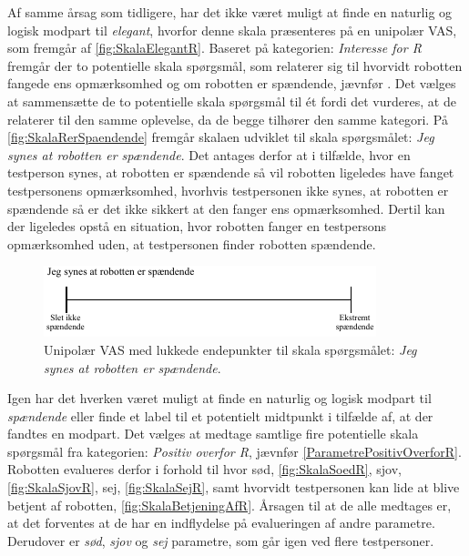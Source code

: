 \noindent
%
Af samme årsag som tidligere, har det ikke været muligt at finde en naturlig og logisk modpart til \textit{elegant}, hvorfor denne skala præsenteres på en unipolær VAS, som fremgår af \autoref{fig:SkalaElegantR}.\blankline
%
Baseret på kategorien: \textit{Interesse for R} fremgår der to potentielle skala spørgsmål, som relaterer sig til hvorvidt robotten fangede ens opmærksomhed og om robotten er spændende, jævnfør . Det vælges at sammensætte de to potentielle skala spørgsmål til ét fordi det vurderes, at de relaterer til den samme oplevelse, da de begge tilhører den samme kategori. På \autoref{fig:SkalaRerSpaendende} fremgår skalaen udviklet til skala spørgsmålet: \textit{Jeg synes at robotten er spændende}. Det antages derfor at i tilfælde, hvor en testperson synes, at robotten er spændende så vil robotten ligeledes have fanget testpersonens opmærksomhed, hvorhvis testpersonen ikke synes, at robotten er spændende så er det ikke sikkert at den fanger ens opmærksomhed. Dertil kan der ligeledes opstå en situation, hvor robotten fanger en testpersons opmærksomhed uden, at testpersonen finder robotten spændende.
%
\begin{figure}[H]
\centering
\includegraphics[width =\textwidth]{Figure/UdvalgteSkalaer/RerSpaendende} 
\caption{Unipolær VAS med lukkede endepunkter til skala spørgsmålet: \textit{Jeg synes at robotten er spændende}.}
\label{fig:SkalaRerSpaendende}
\end{figure}
\noindent
%
Igen har det hverken været muligt at finde en naturlig og logisk modpart til \textit{spændende} eller finde et label til et potentielt midtpunkt i tilfælde af, at der fandtes en modpart.\blankline 
%
Det vælges at medtage samtlige fire potentielle skala spørgsmål fra kategorien: \textit{Positiv overfor R}, jævnfør \autoref{ParametrePositivOverforR}. Robotten evalueres derfor i forhold til hvor sød, \autoref{fig:SkalaSoedR}, sjov, \autoref{fig:SkalaSjovR}, sej, \autoref{fig:SkalaSejR}, samt hvorvidt testpersonen kan lide at blive betjent af robotten, \autoref{fig:SkalaBetjeningAfR}. Årsagen til at de alle medtages er, at det forventes at de har en indflydelse på evalueringen af andre parametre. Derudover er \textit{sød}, \textit{sjov} og \textit{sej} parametre, som går igen ved flere testpersoner. 
